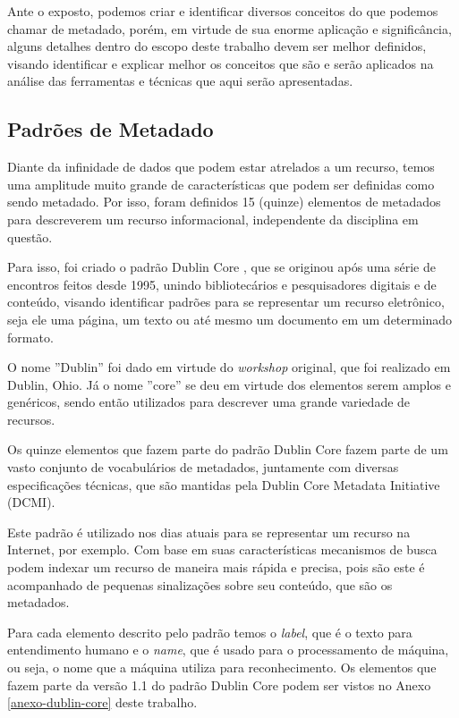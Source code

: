 Ante o exposto, podemos criar e identificar diversos conceitos do que podemos chamar de metadado, porém, em virtude de sua enorme aplicação e significância, alguns detalhes dentro do escopo deste trabalho devem ser melhor definidos, visando identificar e explicar melhor os conceitos que são e serão aplicados na análise das ferramentas e técnicas que aqui serão apresentadas.

\subsection{Padrões de Metadado}

Diante da infinidade de dados que podem estar atrelados a um recurso, temos uma amplitude muito grande de características que podem ser definidas como sendo metadado. Por isso, foram definidos 15 (quinze) elementos de metadados para descreverem um recurso informacional, independente da disciplina em questão. 

Para isso, foi criado o padrão Dublin Core \cite{dublin-core}, que se originou após uma série de encontros feitos desde 1995, unindo bibliotecários e pesquisadores digitais e de conteúdo, visando identificar padrões para se representar um recurso eletrônico, seja ele uma página, um texto ou até mesmo um documento em um determinado formato.

O nome ''Dublin'' foi dado em virtude do \textit{workshop} original, que foi realizado em Dublin, Ohio. Já o nome ''core'' se deu em virtude dos elementos serem amplos e genéricos, sendo então utilizados para descrever uma grande variedade de recursos.

Os quinze elementos que fazem parte do padrão Dublin Core fazem parte de um vasto conjunto de vocabulários de metadados, juntamente com diversas especificações técnicas, que são mantidas pela Dublin Core Metadata Initiative (DCMI).

Este padrão é utilizado nos dias atuais para se representar um recurso na Internet, por exemplo. Com base em suas características mecanismos de busca podem indexar um recurso de maneira mais rápida e precisa, pois são este é acompanhado de pequenas sinalizações sobre seu conteúdo, que são os metadados. 

Para cada elemento descrito pelo padrão temos o \textit{label}, que é o texto para entendimento humano e o \textit{name}, que é usado para o processamento de máquina, ou seja, o nome que a máquina utiliza para reconhecimento. Os elementos que fazem parte da versão 1.1 do padrão Dublin Core podem ser vistos no Anexo \ref{anexo-dublin-core} deste trabalho.

